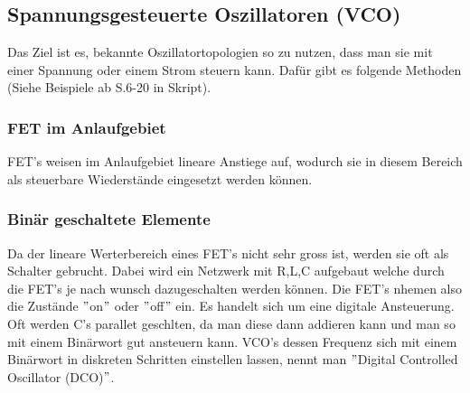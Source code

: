 \FloatBarrier
\subsection{Spannungsgesteuerte Oszillatoren (VCO)}
Das Ziel ist es, bekannte Oszillatortopologien so zu nutzen, dass man sie mit einer Spannung oder einem Strom steuern kann. Dafür gibt es folgende Methoden (Siehe Beispiele ab S.6-20 in Skript).

\FloatBarrier
\subsubsection{FET im Anlaufgebiet}
FET's weisen im Anlaufgebiet lineare Anstiege auf, wodurch sie in diesem Bereich als steuerbare Wiederstände eingesetzt werden können.

\FloatBarrier
\subsubsection{Binär geschaltete Elemente}
Da der lineare Werterbereich eines FET's nicht sehr gross ist, werden sie oft als Schalter gebrucht. Dabei wird ein Netzwerk mit R,L,C aufgebaut welche durch die FET's je nach wunsch dazugeschalten werden können. Die FET's nhemen also die Zustände $"$on$"$ oder $"$off$"$ ein. Es handelt sich um eine digitale Ansteuerung. Oft werden C's parallet geschlten, da man diese dann addieren kann und man so mit einem Binärwort gut ansteuern kann. VCO's dessen Frequenz sich mit einem Binärwort in diskreten Schritten einstellen lassen, nennt man $"$Digital Controlled Oscillator (DCO)$"$.

\FloatBarrier
